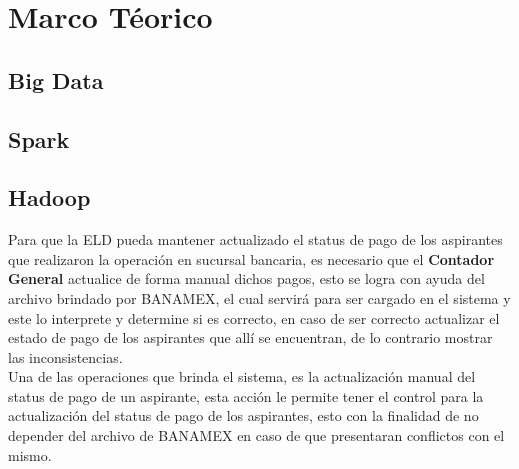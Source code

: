 \hypertarget{seccion:IniciarSesion}{\vspace{1pt}}
\section{Marco Téorico}
\subsection{Big Data}
\subsection{Spark}
\subsection{Hadoop}

Para que la ELD pueda mantener actualizado el status de pago de los aspirantes que realizaron la operación en sucursal bancaria, es necesario que el \textbf{Contador General} actualice de forma manual dichos pagos, esto se logra con ayuda del archivo brindado por BANAMEX, el cual servirá para ser cargado en el sistema y este lo interprete y determine si es correcto, en caso de ser correcto actualizar el estado de pago de los aspirantes que allí se encuentran, de lo contrario mostrar las inconsistencias.\\
Una de las operaciones que brinda el sistema, es la actualización manual del status de pago de un aspirante, esta acción le permite tener el control para la actualización del status de pago de los aspirantes, esto con la finalidad de no depender del archivo de BANAMEX en caso de que presentaran conflictos con el mismo.
